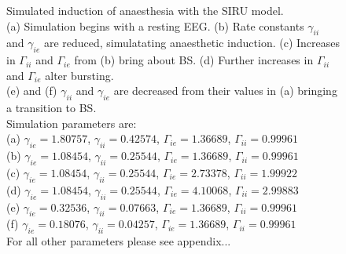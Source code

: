 \documentclass[a4paper,12pt]{article}
\begin{document}
\begin{figure}
	\label{fig:intra_gamma}
	\caption{Simulated induction of anaesthesia with the SIRU model. \\
(a) Simulation begins with a resting EEG. 
(b) Rate constants $\gamma_{ii}$ and $\gamma_{ie}$ are reduced, simulatating anaesthetic induction. (c)  Increases in $\Gamma_{ii}$ and $\Gamma_{ie}$  from (b) bring about BS.
(d) Further increases in $\Gamma_{ii}$ and $\Gamma_{ie}$ alter bursting. \\
(e) and (f) $\gamma_{ii}$ and $\gamma_{ie}$ are decreased from their values in (a) bringing a transition to BS.\\
Simulation parameters are:\\
(a) $\gamma_{ie} = 1.80757$, $\gamma_{ii} = 0.42574$, $\Gamma_{ie} = 1.36689$, $\Gamma_{ii} = 0.99961$\\
(b) $\gamma_{ie} = 1.08454$, $\gamma_{ii} = 0.25544$, $\Gamma_{ie} = 1.36689$, $\Gamma_{ii} = 0.99961$\\
(c) $\gamma_{ie} = 1.08454$, $\gamma_{ii} = 0.25544$, $\Gamma_{ie} = 2.73378$, $\Gamma_{ii} = 1.99922$\\
(d) $\gamma_{ie} = 1.08454$, $\gamma_{ii} = 0.25544$, $\Gamma_{ie} = 4.10068$, $\Gamma_{ii} = 2.99883$\\
(e) $\gamma_{ie} = 0.32536$, $\gamma_{ii} = 0.07663$, $\Gamma_{ie} = 1.36689$, $\Gamma_{ii} = 0.99961$\\
(f) $\gamma_{ie} = 0.18076$, $\gamma_{ii} = 0.04257$, $\Gamma_{ie} = 1.36689$, $\Gamma_{ii} = 0.99961$\\
For all other parameters please see appendix...
}
\end{figure}
\end{document}
